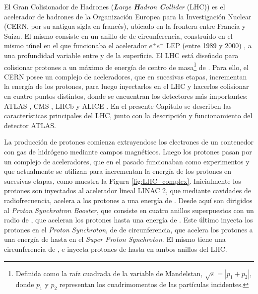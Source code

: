 El Gran Colisionador de Hadrones (\textit{\textbf{L}arge \textbf{H}adron \textbf{C}ollider} (LHC)) \cite{Evans:1129806} es el acelerador de hadrones de la Organización Europea para la Investigación Nuclear (CERN, por su antigua sigla en francés), ubicado en la frontera entre Francia y Suiza. El mismo consiste en un anillo de  de circunferencia, construido en el mismo túnel en el que funcionaba el acelerador $e^{+}e^{-}$ LEP (entre 1989 y 2000) \cite{LEPbook}, a una profundidad variable entre  y  de la superficie. El LHC está diseñado para colisionar protones a un máximo de energía de centro de masa\footnote{Definida como la raíz cuadrada de la variable de Mandelstan, $\sqrt{s}=|p_1+p_2|$, donde $p_1$ y $p_2$ representan los cuadrimomentos de las partículas incidentes.} de . Para ello, el CERN posee un complejo de aceleradores, que en sucesivas etapas, incrementan la energía de los protones, para luego inyectarlos en el LHC y hacerlos colisionar en cuatro puntos distintos, donde se encuentran los detectores más importantes: ATLAS \cite{PERF-2007-01}, CMS \cite{CMS-TDR-08-001}, LHCb \cite{LHCb:2008vvz} y ALICE \cite{ALICE:2008ngc}. En el presente Capítulo se describen las características principales del LHC, junto con la descripción y funcionamiento del detector ATLAS.


La producción de protones comienza extrayendose los electrones de un contenedor con gas de hidrógeno mediante campos magnéticos. Luego los protones pasan por un complejo de aceleradores, que en el pasado funcionaban como experimentos y que actualmente se utilizan para incrementan la energía de los protones en sucesivas etapas, como muestra la Figura \ref{fig:LHC_complex}. Inicialmente los protones son inyectados al acelerador lineal LINAC 2, que mediante cavidades de radiofrecuencia, acelera a los protones a una energía de . Desde aquí son dirigidos al \textit{Proton Synchrotron Booster}, que consiste en cuatro anillos superpuestos con un radio de , que aceleran los protones hasta una energía de . Este último inyecta los protones en el \textit{Proton Synchroton}, de  de circunferencia, que acelera los protones a una energía de hasta  en el \textit{Super Proton Synchroton}. El mismo tiene una circunferencia de , e inyecta protones de hasta  en ambos anillos del LHC. 



